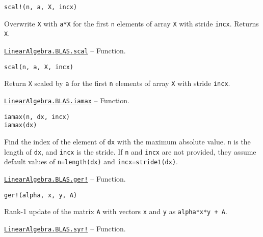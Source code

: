 \begin{adjustwidth}{2em}{0pt}


\begin{verbatim}
scal!(n, a, X, incx)
\end{verbatim}

Overwrite \texttt{X} with \texttt{a*X} for the first \texttt{n} elements of array \texttt{X} with stride \texttt{incx}. Returns \texttt{X}.



\end{adjustwidth}
\hypertarget{12895642275868597015}{} 
\hyperlink{12895642275868597015}{\texttt{LinearAlgebra.BLAS.scal}}  -- {Function.}

\begin{adjustwidth}{2em}{0pt}


\begin{verbatim}
scal(n, a, X, incx)
\end{verbatim}

Return \texttt{X} scaled by \texttt{a} for the first \texttt{n} elements of array \texttt{X} with stride \texttt{incx}.



\end{adjustwidth}
\hypertarget{7368077295193322508}{} 
\hyperlink{7368077295193322508}{\texttt{LinearAlgebra.BLAS.iamax}}  -- {Function.}

\begin{adjustwidth}{2em}{0pt}


\begin{verbatim}
iamax(n, dx, incx)
iamax(dx)
\end{verbatim}

Find the index of the element of \texttt{dx} with the maximum absolute value. \texttt{n} is the length of \texttt{dx}, and \texttt{incx} is the stride. If \texttt{n} and \texttt{incx} are not provided, they assume default values of \texttt{n=length(dx)} and \texttt{incx=stride1(dx)}.



\end{adjustwidth}
\hypertarget{15218685048281144798}{} 
\hyperlink{15218685048281144798}{\texttt{LinearAlgebra.BLAS.ger!}}  -- {Function.}

\begin{adjustwidth}{2em}{0pt}


\begin{verbatim}
ger!(alpha, x, y, A)
\end{verbatim}

Rank-1 update of the matrix \texttt{A} with vectors \texttt{x} and \texttt{y} as \texttt{alpha*x*y{\textquotesingle} + A}.



\end{adjustwidth}
\hypertarget{12739496223053575792}{} 
\hyperlink{12739496223053575792}{\texttt{LinearAlgebra.BLAS.syr!}}  -- {Function.}

